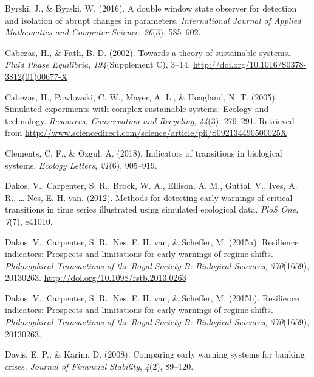 \documentclass[12pt,twoside,openany]{reedthesis}
\begin{document}
\leavevmode\hypertarget{ref-byrski2016double}{}%
Byrski, J., \& Byrski, W. (2016). A double window state observer for detection and isolation of abrupt changes in parameters. \emph{International Journal of Applied Mathematics and Computer Science}, \emph{26}(3), 585--602.

\leavevmode\hypertarget{ref-cabezas_towards_2002}{}%
Cabezas, H., \& Fath, B. D. (2002). Towards a theory of sustainable systems. \emph{Fluid Phase Equilibria}, \emph{194}(Supplement C), 3--14. \url{http://doi.org/10.1016/S0378-3812(01)00677-X}

\leavevmode\hypertarget{ref-cabezas_simulated_2005}{}%
Cabezas, H., Pawlowski, C. W., Mayer, A. L., \& Hoagland, N. T. (2005). Simulated experiments with complex sustainable systems: Ecology and technology. \emph{Resources, Conservation and Recycling}, \emph{44}(3), 279--291. Retrieved from \url{http://www.sciencedirect.com/science/article/pii/S092134490500025X}

\leavevmode\hypertarget{ref-clements2018indicators}{}%
Clements, C. F., \& Ozgul, A. (2018). Indicators of transitions in biological systems. \emph{Ecology Letters}, \emph{21}(6), 905--919.

\leavevmode\hypertarget{ref-dakos_methods_2012}{}%
Dakos, V., Carpenter, S. R., Brock, W. A., Ellison, A. M., Guttal, V., Ives, A. R., \ldots{} Nes, E. H. van. (2012). Methods for detecting early warnings of critical transitions in time series illustrated using simulated ecological data. \emph{PloS One}, \emph{7}(7), e41010.

\leavevmode\hypertarget{ref-dakos_resilience_2015}{}%
Dakos, V., Carpenter, S. R., Nes, E. H. van, \& Scheffer, M. (2015a). Resilience indicators: Prospects and limitations for early warnings of regime shifts. \emph{Philosophical Transactions of the Royal Society B: Biological Sciences}, \emph{370}(1659), 20130263. \url{http://doi.org/10.1098/rstb.2013.0263}

\leavevmode\hypertarget{ref-dakos2015resilience}{}%
Dakos, V., Carpenter, S. R., Nes, E. H. van, \& Scheffer, M. (2015b). Resilience indicators: Prospects and limitations for early warnings of regime shifts. \emph{Philosophical Transactions of the Royal Society B: Biological Sciences}, \emph{370}(1659), 20130263.

\leavevmode\hypertarget{ref-davis_comparing_2008}{}%
Davis, E. P., \& Karim, D. (2008). Comparing early warning systems for banking crises. \emph{Journal of Financial Stability}, \emph{4}(2), 89--120.
\end{document}
